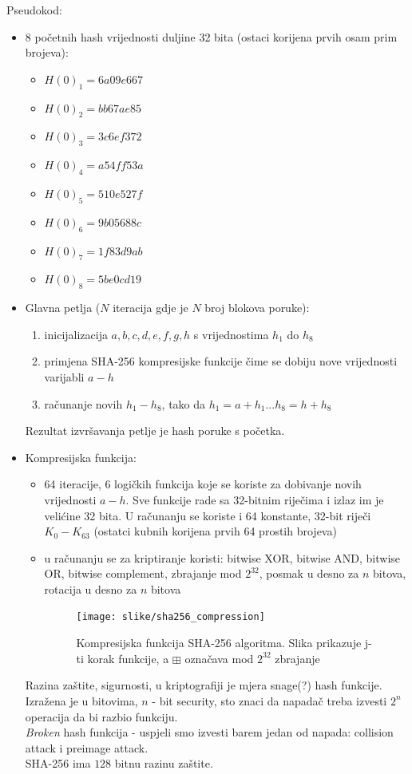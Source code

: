 \documentclass[12pt]{article}
\begin{document}
Pseudokod:
\begin{itemize}
	\item 8 početnih hash vrijednosti duljine 32 bita (ostaci korijena prvih osam prim brojeva):
	\begin{itemize}
		\item $H(0)_1 = 6a09e667$
		\item $H(0)_2 = bb67ae85$
		\item $H(0)_3 = 3c6ef372$
		\item $H(0)_4 = a54ff53a$
		\item $H(0)_5 = 510e527f$
		\item $H(0)_6 = 9b05688c$
		\item $H(0)_7 = 1f83d9ab$
		\item $H(0)_8 = 5be0cd19$
	\end{itemize}
	\item Glavna petlja ($N$ iteracija gdje je $N$ broj blokova poruke):
	\begin{enumerate}
		\item inicijalizacija $a, b, c, d, e, f, g, h$ s vrijednostima $h_1$ do $h_8$
		\item primjena SHA-256 kompresijske funkcije čime se dobiju nove vrijednosti varijabli $a - h$
		\item računanje novih $h_1 - h_8$, tako da $h_1 = a + h_1 . . . h_8 = h + h_8$
	\end{enumerate}
	Rezultat izvršavanja petlje je hash poruke s početka.
	\item Kompresijska funkcija:
	\begin{itemize}
		\item 64 iteracije, 6 logičkih funkcija koje se koriste za dobivanje novih vrijednosti $a - h$. Sve funkcije rade sa 32-bitnim riječima i izlaz im je velićine 32 bita. U računanju se koriste i 64 konstante, 32-bit riječi $K_0-K_{63}$ (ostatci kubnih korijena prvih 64 prostih brojeva)
		\item u računanju se za kriptiranje koristi: bitwise XOR, bitwise AND, bitwise OR, bitwise complement, zbrajanje mod $2^{32}$, posmak u desno za $n$ bitova, rotacija u desno za $n$ bitova\cite{sha-description}
		\begin{figure}[h!]
			\centering
			\texttt{[image: slike/sha256\_compression]}
			\caption{Kompresijska funkcija SHA-256 algoritma. Slika prikazuje j-ti korak funkcije, a $\boxplus$ označava mod $2^{32}$ zbrajanje}
		\end{figure}
	\end{itemize}
	
	Razina zaštite, sigurnosti, u kriptografiji je mjera snage(?) hash funkcije. Izražena je u bitovima, $n$ - bit security, sto znaci da napadač treba izvesti $2^n$ operacija da bi razbio funkciju.\\ \textit{Broken} hash funkcija - uspjeli smo izvesti barem jedan od napada: collision attack i preimage attack. \\ 
	SHA-256 ima $128$ bitnu razinu zaštite.
\end{itemize}
\end{document}
